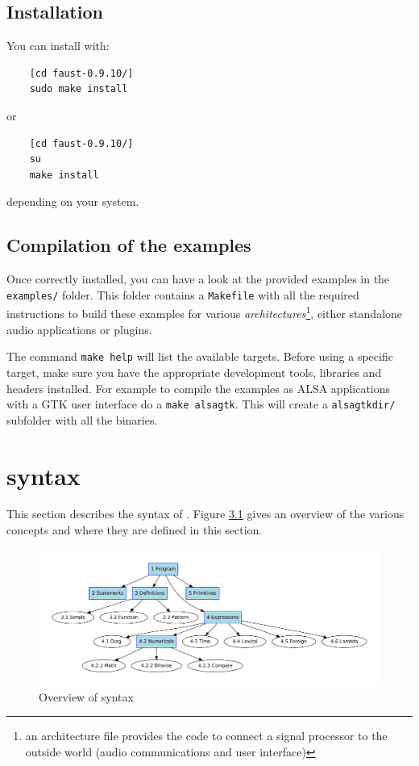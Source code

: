 \documentclass[a4paper]{book}
\begin{document}
\section{Installation}
You can install \faust with:
\begin{lstlisting}
	[cd faust-0.9.10/]
	sudo make install
\end{lstlisting}
or
\begin{lstlisting}
	[cd faust-0.9.10/]
	su
	make install
\end{lstlisting}
depending on your system.


\section{Compilation of the examples}
Once \faust correctly installed, you can have a look at the provided examples in the \lstinline'examples/' folder. This folder contains a  \lstinline'Makefile' with all the required instructions to build these examples for various \textit{architectures}\footnote{an architecture file provides the code to connect a signal processor to the outside world (audio communications and user interface)}, either standalone audio applications or plugins.

The command \lstinline'make help' will list the available targets. Before using a specific target, make sure you have the appropriate development tools, libraries and headers installed. For example to compile the examples as ALSA applications with a GTK user interface do a \lstinline'make alsagtk'. This will create a \lstinline'alsagtkdir/' subfolder with all the binaries. 


\chapter{\faust syntax}

This section describes the syntax of \faust. Figure \ref{fig:syntax} gives an overview of the various concepts and where they are defined in this section. 

\begin{figure}[ht!]
\centering
\includegraphics[scale=0.45]{illustrations/syntax-chart}
\caption{Overview of \faust syntax}
\label{fig:syntax}
\end{figure}
\end{document}
